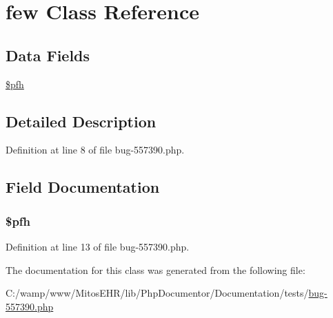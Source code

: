 \hypertarget{classfew}{\section{few \-Class \-Reference}
\label{classfew}
}
\subsection*{\-Data \-Fields}
\begin{DoxyCompactItemize}
\item 
\hyperlink{classfew_aa878177219b686665fd6d0a7ab6bb596}{\$pfh}
\end{DoxyCompactItemize}


\subsection{\-Detailed \-Description}


\-Definition at line 8 of file bug-\/557390.\-php.



\subsection{\-Field \-Documentation}
\hypertarget{classfew_aa878177219b686665fd6d0a7ab6bb596}{
\subsubsection[{\$pfh}]{\setlength{\rightskip}{0pt plus 5cm}\$pfh}}\label{classfew_aa878177219b686665fd6d0a7ab6bb596}


\-Definition at line 13 of file bug-\/557390.\-php.



\-The documentation for this class was generated from the following file\-:\begin{DoxyCompactItemize}
\item 
\-C\-:/wamp/www/\-Mitos\-E\-H\-R/lib/\-Php\-Documentor/\-Documentation/tests/\hyperlink{bug-557390_8php}{bug-\/557390.\-php}\end{DoxyCompactItemize}
